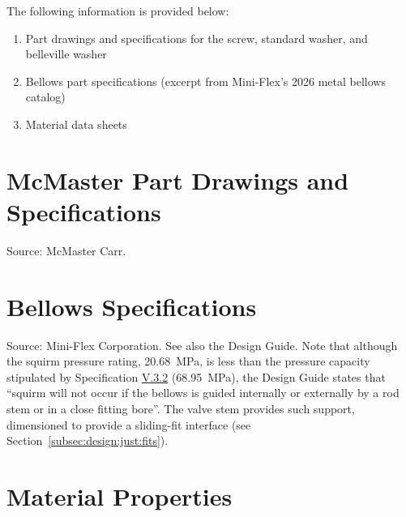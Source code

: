 \documentclass[12pt, letterpaper]{report}%
\newcounter{mycounter}           %
\newcounter{sub}[mycounter]      %
\newcommand{\specBellowsSquirm}{\SI{20.68}{\mega \pascal}} %
\newcommand{\specPressure}{\SI{68.95}{\mega \pascal}}%
\newcommand{\specref}[1]{\hyperref[tab:specs]{#1}}
\begin{document}
\begin{appendices}
	The following information is provided below:

	\begin{enumerate}
		\item Part drawings and specifications for the screw, standard washer, and belleville washer
		\item Bellows part specifications (excerpt from Mini-Flex's 2026 metal bellows catalog)
		\item Material data sheets
	\end{enumerate}

	\newpage
	\section{McMaster Part Drawings and Specifications}
	\label{app:datasheets:McMaster}

		Source: McMaster Carr\cite{ref_McMaster_screw, ref_McMaster_std, ref_McMaster_belle}.
	
		
		
		
		
		
		

	\section{Bellows Specifications}
	\label{app:datasheets:Bellows}

		Source: Mini-Flex Corporation\cite{ref_miniflex_catalog}. See also the Design Guide\cite{ref_miniflex_design}.
		Note that although the squirm pressure rating, \specBellowsSquirm, is less than the pressure capacity stipulated by Specification \specref{V.3.2} (\specPressure), the Design Guide states that ``squirm will not occur if the bellows is guided internally or externally by a rod stem or in a close fitting bore''\cite[p.~5]{ref_miniflex_design}.
		The valve stem provides such support, dimensioned to provide a sliding-fit interface (see Section~\ref{subsec:design:just:fits}).

		

	\section{Material Properties}
	\label{app:datasheets:mat}


\end{appendices}
\end{document}
